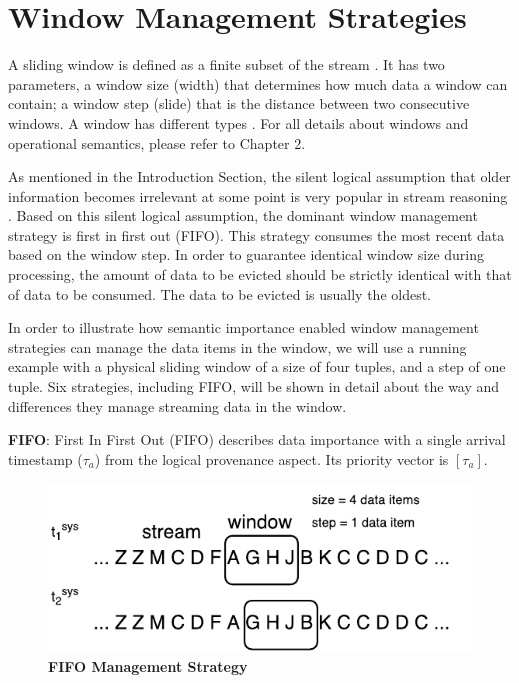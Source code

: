 \section{Window Management Strategies}
A sliding window is defined as a finite subset of the stream \cite{botan2010secret}. 
It has two parameters, a window size (width) that determines how much data a window can contain; 
a window step (slide) that is the distance between two consecutive windows. 
A window has different types \cite{barbieri2010querying} \cite{patroumpas2006window}.
For all details about windows and operational semantics, please refer to Chapter 2. 

As mentioned in the Introduction Section, the silent logical assumption that older information becomes irrelevant at some point \cite{barbieri2010stream} \cite{stuckenschmidt2010towards} is very popular in stream reasoning \cite{golab2003processing} \cite{barbieri2010deductive}.
Based on this silent logical assumption, the dominant window management strategy is first in first out (FIFO). 
This strategy consumes the most recent data based on the window step. 
In order to guarantee identical window size during processing, the amount of data to be evicted should be strictly identical with that of data to be consumed.
The data to be evicted is usually the oldest.

In order to illustrate how semantic importance enabled window management strategies can manage the data items in the window, we will use a running example with a physical sliding window of a size of four tuples, and a step of one tuple. 
Six strategies, including FIFO, will be shown in detail about the way and differences they manage streaming data in the window.

\textbf{FIFO}:
First In First Out (FIFO) describes data importance with a single arrival timestamp ($\tau_{a}$) from the logical provenance aspect. 
Its priority vector is $[\tau_{a}]$.

\begin{figure}[!htbp]
	\centering
    \includegraphics[width=5in]{img/3-sififo.pdf}
    \caption{\textbf{FIFO Management Strategy}}
    \label{fig:3-sififo}
\end{figure}

